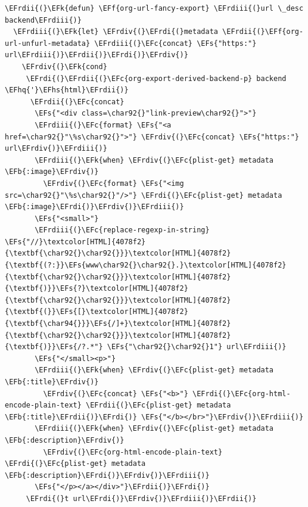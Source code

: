 \documentclass{scrartcl}
\newcommand{\EFk}[1]{\textcolor{EFk}{#1}} %
\newcommand{\EFs}[1]{\textcolor{EFs}{#1}} %
\newcommand{\EFb}[1]{\textcolor{EFb}{#1}} %
\newcommand{\EFc}[1]{\textcolor{EFc}{#1}} %
\newcommand{\EFf}[1]{\textcolor{EFf}{#1}} %
\newcommand{\EFhq}[1]{\textcolor{EFhq}{#1}} %
\newcommand{\EFhs}[1]{\textcolor{EFhs}{#1}} %
\newcommand{\EFrdi}[1]{\textcolor{EFrdi}{#1}} %
\newcommand{\EFrdii}[1]{\textcolor{EFrdii}{#1}} %
\newcommand{\EFrdiii}[1]{\textcolor{EFrdiii}{#1}} %
\newcommand{\EFrdiv}[1]{\textcolor{EFrdiv}{#1}} %
\begin{document}
\begin{Code}
\begin{Verbatim}[]
 \EFrdii{(}\EFk{defun} \EFf{org-url-fancy-export} \EFrdiii{(}url \_desc backend\EFrdiii{)}
  \EFrdiii{(}\EFk{let} \EFrdiv{(}\EFrdi{(}metadata \EFrdii{(}\EFf{org-url-unfurl-metadata} \EFrdiii{(}\EFc{concat} \EFs{"https:"} url\EFrdiii{)}\EFrdii{)}\EFrdi{)}\EFrdiv{)}
    \EFrdiv{(}\EFk{cond}
     \EFrdi{(}\EFrdii{(}\EFc{org-export-derived-backend-p} backend \EFhq{'}\EFhs{html}\EFrdii{)}
      \EFrdii{(}\EFc{concat}
       \EFs{"<div class=\char92{}"link-preview\char92{}">"}
       \EFrdiii{(}\EFc{format} \EFs{"<a href=\char92{}"\%s\char92{}">"} \EFrdiv{(}\EFc{concat} \EFs{"https:"} url\EFrdiv{)}\EFrdiii{)}
       \EFrdiii{(}\EFk{when} \EFrdiv{(}\EFc{plist-get} metadata \EFb{:image}\EFrdiv{)}
         \EFrdiv{(}\EFc{format} \EFs{"<img src=\char92{}"\%s\char92{}"/>"} \EFrdi{(}\EFc{plist-get} metadata \EFb{:image}\EFrdi{)}\EFrdiv{)}\EFrdiii{)}
       \EFs{"<small>"}
       \EFrdiii{(}\EFc{replace-regexp-in-string} \EFs{"//}\textcolor[HTML]{4078f2}{\textbf{\char92{}\char92{}}}\textcolor[HTML]{4078f2}{\textbf{(?:}}\EFs{www\char92{}\char92{}.}\textcolor[HTML]{4078f2}{\textbf{\char92{}\char92{}}}\textcolor[HTML]{4078f2}{\textbf{)}}\EFs{?}\textcolor[HTML]{4078f2}{\textbf{\char92{}\char92{}}}\textcolor[HTML]{4078f2}{\textbf{(}}\EFs{[}\textcolor[HTML]{4078f2}{\textbf{\char94{}}}\EFs{/]+}\textcolor[HTML]{4078f2}{\textbf{\char92{}\char92{}}}\textcolor[HTML]{4078f2}{\textbf{)}}\EFs{/?.*"} \EFs{"\char92{}\char92{}1"} url\EFrdiii{)}
       \EFs{"</small><p>"}
       \EFrdiii{(}\EFk{when} \EFrdiv{(}\EFc{plist-get} metadata \EFb{:title}\EFrdiv{)}
         \EFrdiv{(}\EFc{concat} \EFs{"<b>"} \EFrdi{(}\EFc{org-html-encode-plain-text} \EFrdii{(}\EFc{plist-get} metadata \EFb{:title}\EFrdii{)}\EFrdi{)} \EFs{"</b></br>"}\EFrdiv{)}\EFrdiii{)}
       \EFrdiii{(}\EFk{when} \EFrdiv{(}\EFc{plist-get} metadata \EFb{:description}\EFrdiv{)}
         \EFrdiv{(}\EFc{org-html-encode-plain-text} \EFrdi{(}\EFc{plist-get} metadata \EFb{:description}\EFrdi{)}\EFrdiv{)}\EFrdiii{)}
       \EFs{"</p></a></div>"}\EFrdii{)}\EFrdi{)}
     \EFrdi{(}t url\EFrdi{)}\EFrdiv{)}\EFrdiii{)}\EFrdii{)}


\end{Verbatim}
\end{Code}
\end{document}
